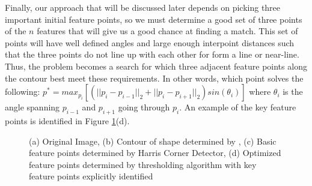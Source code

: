 \documentclass[paper=a4, fontsize=11pt]{scrartcl} %
\begin{document}


Finally, our approach that will be discussed later depends on picking three important initial feature points, so we must determine a good set of three points of the $n$ features that will give us a good chance at finding a match. This set of points will have well defined angles and large enough interpoint distances such that the three points do not line up with each other for form a line or near-line. Thus, the problem becomes a search for which three adjacent feature points along the contour best meet these requirements. In other words, which point solves the following: $p^* = max_{p_i} [ (||p_i - p_{i-1}||_2 + ||p_i - p_{i+1}||_2) sin(\theta_i) ]$ where $\theta_i$ is the angle spanning $p_{i-1}$ and $p_{i+1}$ going through $p_i$. An example of the key feature points is identified in Figure \ref{feat_detect}(d). 

\begin{figure}
\caption{(a) Original Image, (b) Contour of shape determined by \cite{Suzuki1985}, (c) Basic feature points determined by Harris Corner Detector, (d) Optimized feature points determined by thresholding algorithm with key feature points explicitly identified}
\label{feat_detect}
\end{figure}
\end{document}
